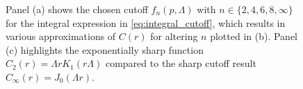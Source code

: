 \begin{figure}
    \caption{Panel (a) shows the chosen cutoff $f_n(p,\Lambda)$ with $n\in\{2,4,6,8,\infty\}$ for the integral expression in \cref{eq:integral_cutoff}, which results in various approximations of $C(r)$ for altering $n$ plotted in (b). Panel (c) highlights the exponentially sharp function $C_2(r)=\Lambda rK_1(r\Lambda)$ compared to the sharp cutoff result $C_\infty(r)=J_0(\Lambda r)$.}
    \label{fig:rg_cutoff}
\end{figure}

